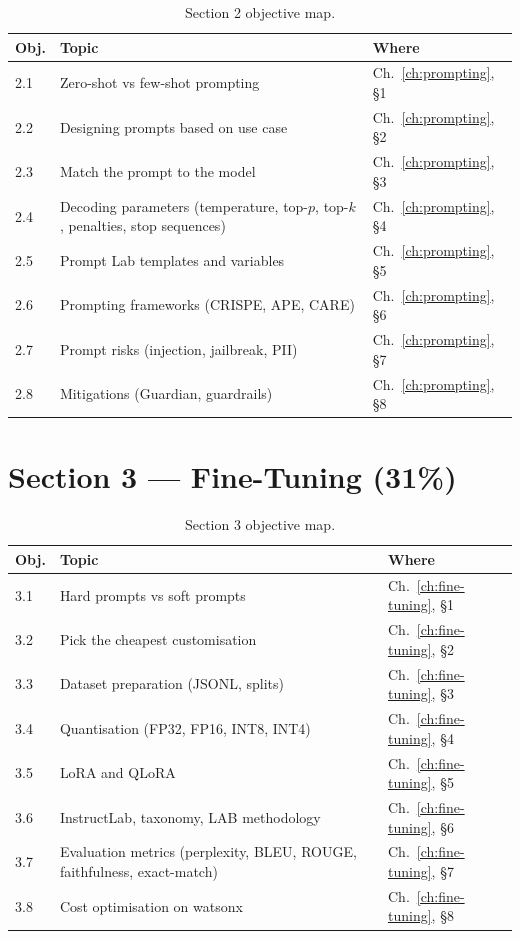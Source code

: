 \begin{table}[h]
\centering
\small
\begin{tabularx}{\textwidth}{l X l}
\toprule
\textbf{Obj.} & \textbf{Topic} & \textbf{Where} \\
\midrule
2.1 & Zero-shot vs few-shot prompting             & Ch.~\ref{ch:prompting}, \S 1 \\
2.2 & Designing prompts based on use case         & Ch.~\ref{ch:prompting}, \S 2 \\
2.3 & Match the prompt to the model               & Ch.~\ref{ch:prompting}, \S 3 \\
2.4 & Decoding parameters (temperature, top-$p$, top-$k$, penalties, stop sequences) & Ch.~\ref{ch:prompting}, \S 4 \\
2.5 & Prompt Lab templates and variables          & Ch.~\ref{ch:prompting}, \S 5 \\
2.6 & Prompting frameworks (CRISPE, APE, CARE)    & Ch.~\ref{ch:prompting}, \S 6 \\
2.7 & Prompt risks (injection, jailbreak, PII)    & Ch.~\ref{ch:prompting}, \S 7 \\
2.8 & Mitigations (Guardian, guardrails)          & Ch.~\ref{ch:prompting}, \S 8 \\
\bottomrule
\end{tabularx}
\caption{Section 2 objective map.}
\end{table}

\section*{Section 3 --- Fine-Tuning (31\%)}

\begin{table}[h]
\centering
\small
\begin{tabularx}{\textwidth}{l X l}
\toprule
\textbf{Obj.} & \textbf{Topic} & \textbf{Where} \\
\midrule
3.1 & Hard prompts vs soft prompts                & Ch.~\ref{ch:fine-tuning}, \S 1 \\
3.2 & Pick the cheapest customisation             & Ch.~\ref{ch:fine-tuning}, \S 2 \\
3.3 & Dataset preparation (JSONL, splits)         & Ch.~\ref{ch:fine-tuning}, \S 3 \\
3.4 & Quantisation (FP32, FP16, INT8, INT4)       & Ch.~\ref{ch:fine-tuning}, \S 4 \\
3.5 & LoRA and QLoRA                              & Ch.~\ref{ch:fine-tuning}, \S 5 \\
3.6 & InstructLab, taxonomy, LAB methodology      & Ch.~\ref{ch:fine-tuning}, \S 6 \\
3.7 & Evaluation metrics (perplexity, BLEU, ROUGE, faithfulness, exact-match) & Ch.~\ref{ch:fine-tuning}, \S 7 \\
3.8 & Cost optimisation on watsonx                & Ch.~\ref{ch:fine-tuning}, \S 8 \\
\bottomrule
\end{tabularx}
\caption{Section 3 objective map.}
\end{table}

